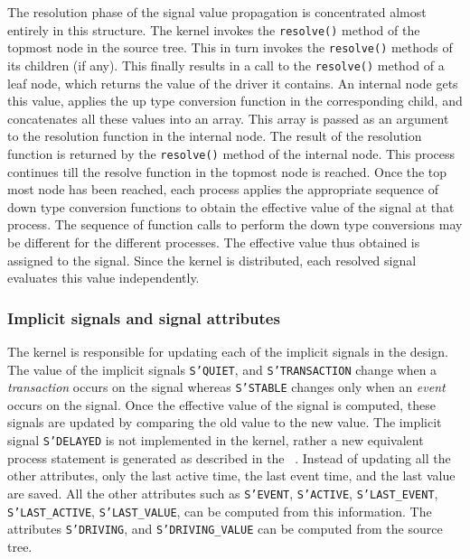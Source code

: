 \documentclass[11pt]{article}
\begin{document}

The resolution phase of the signal value propagation is concentrated
almost entirely in this structure.  The \tyvis\/ kernel invokes the
\texttt{resolve()} method of the topmost node in the source tree.  This in
turn invokes the \texttt{resolve()} methods of its children (if any).
This finally results in a call to the \texttt{resolve()} method of a
leaf node, which returns the value of the driver it contains.  An
internal node gets this value, applies the up type conversion function
in the corresponding child, and concatenates all these values into an
array.  This array is passed as an argument to the resolution function
in the internal node.  The result of the resolution function is
returned by the \texttt{resolve()} method of the internal node.  This
process continues till the resolve function in the topmost node is
reached.  Once the top most node has been reached, each process
applies the appropriate sequence of down type conversion functions to
obtain the effective value of the signal at that process.  The
sequence of function calls to perform the down type conversions may be
different for the different processes.  The effective value thus
obtained is assigned to the signal.  Since the \tyvis\/ kernel is
distributed, each resolved signal evaluates this value independently.

\subsubsection{Implicit signals and signal attributes}

The kernel is responsible for updating each of the implicit signals in
the design.  The value of the implicit signals \texttt{S'QUIET}, and
\texttt{S'TRANSACTION} change when a \textit{transaction} occurs on the
signal whereas \texttt{S'STABLE} changes only when an \textit{event}
occurs on the signal.  Once the effective value of the signal is computed,
these signals are updated by comparing the old value to the new value.
The implicit signal \texttt{S'DELAYED} is not implemented in the kernel,
rather a new equivalent process statement is generated as described in the
\LRM~.  Instead of updating all the other attributes, only
the last active time, the last event time, and the last value are
saved.  All the other attributes such as \texttt{S'EVENT},
\texttt{S'ACTIVE}, \texttt{S'LAST\_EVENT}, \texttt{S'LAST\_ACTIVE},
\texttt{S'LAST\_VALUE}, can be computed from this information.  The
attributes \texttt{S'DRIVING}, and \texttt{S'DRIVING\_VALUE} can be
computed from the source tree.
\end{document}
